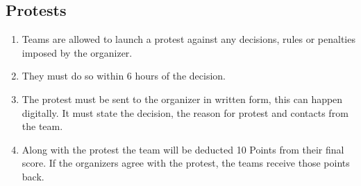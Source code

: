     \subsection{Protests}
    \begin{enumerate}
      \item Teams are allowed to launch a protest against any decisions, rules or penalties imposed by the organizer.
      \item They must do so within 6 hours of the decision. 
      \item The protest must be sent to the organizer in written form, this can happen digitally. It must state the decision, the reason for protest and contacts from the team.
      \item Along with the protest the team will be deducted 10 Points from their final score. If the organizers agree with the protest, the teams receive those points back. 
    \end{enumerate}

